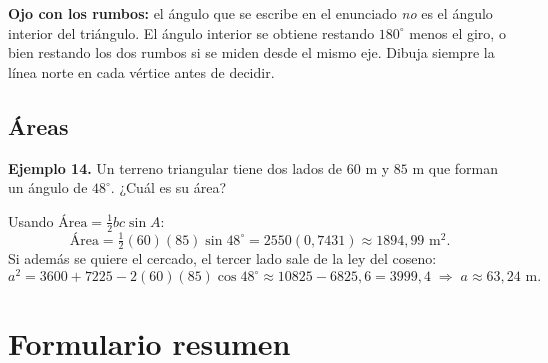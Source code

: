 \documentclass[12pt, letterpaper]{article}
\providecommand{\sen}{\sin}
\begin{document}
\begin{cuadroadvertencia}
  \small
  \textbf{Ojo con los rumbos:} el ángulo que se escribe en el enunciado
  \emph{no} es el ángulo interior del triángulo. El ángulo interior se obtiene
  restando $180^{\circ}$ menos el giro, o bien restando los dos rumbos si se
  miden desde el mismo eje. Dibuja siempre la línea norte en cada vértice antes
  de decidir.
\end{cuadroadvertencia}

\subsection*{Áreas}

\begin{cuadrosolucion}
  \small
  \textbf{Ejemplo 14.} Un terreno triangular tiene dos lados de $60$ m y $85$ m
  que forman un ángulo de $48^{\circ}$. ¿Cuál es su área?

  Usando $\text{Área}=\tfrac{1}{2}bc\sen A$:
  \[
    \text{Área}=\tfrac{1}{2}(60)(85)\sen 48^{\circ}
    =2550(0{,}7431)\approx 1894{,}99\text{ m}^{2}.
  \]
  Si además se quiere el cercado, el tercer lado sale de la ley del coseno:
  \[
    a^{2}=3600+7225-2(60)(85)\cos 48^{\circ}
    \approx 10825-6825{,}6=3999{,}4
    \;\Longrightarrow\; a\approx 63{,}24\text{ m}.
  \]
\end{cuadrosolucion}

\section{Formulario resumen}
\end{document}
